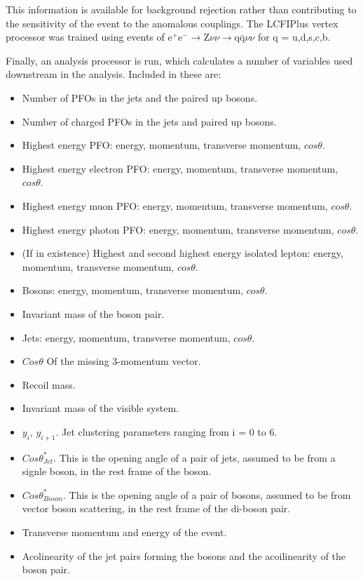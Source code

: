 This information is available for background rejection rather than contributing to the sensitivity of the event to the anomalous couplings. The LCFIPlus vertex processor was trained using events of $\text{e}^{+}\text{e}^{-}\rightarrow \text{Z}\nu\nu \rightarrow \text{q}\bar{\text{q}}\nu\nu$ for q = u,d,s,c,b.

Finally, an analysis processor is run, which calculates a number of variables used downstream in the analysis. Included in these are:
\begin{itemize}
\item Number of PFOs in the jets and the paired up bosons.
\item Number of charged PFOs in the jets and paired up bosons.
\item Highest energy PFO: energy, momentum, transverse momentum, $cos\theta$.
\item Highest energy electron PFO: energy, momentum, transverse momentum, $cos\theta$.
\item Highest energy muon PFO: energy, momentum, transverse momentum, $cos\theta$.
\item Highest energy photon PFO: energy, momentum, transverse momentum, $cos\theta$.
\item (If in existence) Highest and second highest energy isolated lepton: energy, momentum, transverse momentum, $cos\theta$.
\item Bosons: energy, momentum, transverse momentum, $cos\theta$.
\item Invariant mass of the boson pair.
\item Jets: energy, momentum, transverse momentum, $cos\theta$.
\item $Cos\theta$ Of the missing 3-momentum vector.
\item Recoil mass.
\item Invariant mass of the visible system.
\item $y_{i}$, $y_{i+1}$. Jet clustering parameters ranging from i = 0 to 6.
\item $Cos\theta^{*}_{Jet}$.  This is the opening angle of a pair of jets, assumed to be from a signle boson, in the rest frame of the boson.
\item $Cos\theta^{*}_{Boson}$.  This is the opening angle of a pair of bosons, assumed to be from vector boson scattering, in the rest frame of the di-boson pair.
\item Transverse momentum and energy of the event.
\item Acolinearity of the jet pairs forming the bosons and the acoilinearity of the boson pair.

\end{itemize}
